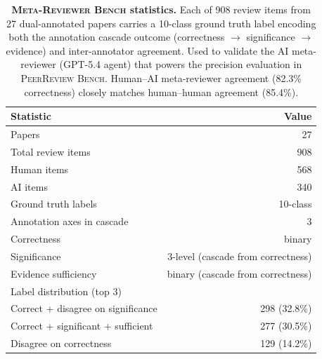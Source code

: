 \begin{table}[t]
\centering
\fontsize{8}{10.5}\selectfont
\setlength{\tabcolsep}{5pt}
\begin{tabular}{lr}
\toprule
\textbf{Statistic} & \textbf{Value} \\
\midrule
Papers & 27 \\
Total review items & 908 \\
\quad Human items & 568 \\
\quad AI items & 340 \\
\midrule
Ground truth labels & 10-class \\
Annotation axes in cascade & 3 \\
\quad Correctness & binary \\
\quad Significance & 3-level (cascade from correctness) \\
\quad Evidence sufficiency & binary (cascade from correctness) \\
\midrule
Label distribution (top 3) & \\
\quad Correct + disagree on significance & 298 (32.8\%) \\
\quad Correct + significant + sufficient & 277 (30.5\%) \\
\quad Disagree on correctness & 129 (14.2\%) \\
\bottomrule
\end{tabular}
\caption{\textbf{\textsc{Meta-Reviewer Bench} statistics.}
Each of 908 review items from 27 dual-annotated papers carries a 10-class ground truth label encoding both the annotation cascade outcome (correctness $\to$ significance $\to$ evidence) and inter-annotator agreement.
Used to validate the AI meta-reviewer (GPT-5.4 agent) that powers the precision evaluation in \textsc{PeerReview Bench}.
Human--AI meta-reviewer agreement (82.3\% correctness) closely matches human--human agreement (85.4\%).
}
\label{tab:stats-metareview-bench}
\end{table}

